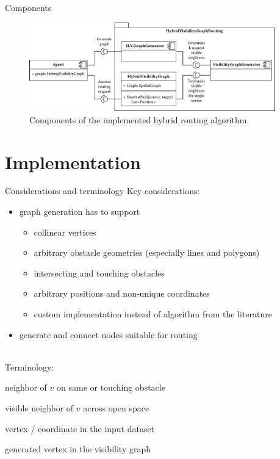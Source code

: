 \documentclass[xcolor={x11names}]{beamer}
\renewcommand{\n}{\hfill\\[0.5ex]}
\newcommand{\nn}{\hfill\\[2ex]}
\newenvironment{figcenter}
{%
	\parskip=0pt%
	\par%
	\nopagebreak%
	\centering%
}%
{%
	\par%
	\noindent%
	\ignorespacesafterend%
}
\begin{document}
		\begin{frame}{Components}
			\begin{figure}[t]
				\begin{figcenter}
					\includegraphics[width=0.95\textwidth]{images/components.pdf}
				\end{figcenter}
				\caption{Components of the implemented hybrid routing algorithm.}
			\end{figure}
		\end{frame}
	
	\section{Implementation}
	
		\begin{frame}{Considerations and terminology}
			Key considerations:\n
			\begin{itemize}
				\item graph generation has to support
				\begin{itemize}
					\item collinear vertices
					\item arbitrary obstacle geometries (especially lines and polygons)
					\item intersecting and touching obstacles
					\item arbitrary positions and non-unique coordinates
					\item[\textrightarrow] custom implementation instead of algorithm from the literature
				\end{itemize}
				\item generate and connect nodes suitable for routing
			\end{itemize}
			\nn
			\pause
			Terminology:\n
			\begin{description}
				\item[obstacle neighbor] neighbor of $v$ on same or touching obstacle
				\item[visibility neighbor] visible neighbor of $v$ across open space
				\item[input vertex] vertex / coordinate in the input dataset
				\item[output vertex] generated vertex in the visibility graph
			\end{description}
		\end{frame}
		
\end{document}
